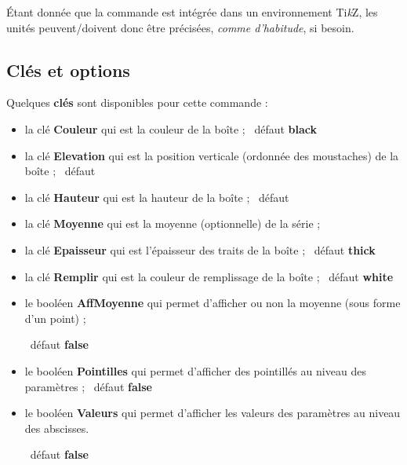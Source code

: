 \documentclass[a4paper,french,11pt]{article}
\providecommand\tikzlogo{Ti\textit{k}Z}
\let\TikZ\tikzlogo
\newcommand\Cle[1]{{\bfseries\sffamily\textlangle #1\textrangle}}
\begin{document}
\begin{PresCodePL}{}
\end{PresCodePL}

\begin{noteblock}
Étant donnée que la commande est intégrée dans un environnement \TikZ, les unités peuvent/doivent donc être précisées, \textit{comme d'habitude}, si besoin.
\end{noteblock}

\subsection{Clés et options}

\begin{cautionblock}
Quelques \Cle{clés} sont disponibles pour cette commande :

\begin{itemize}
	\item la clé \Cle{Couleur} qui est la couleur de la boîte ; \hfill~défaut \Cle{black}
	\item la clé \Cle{Elevation} qui est la position verticale (ordonnée des moustaches) de la boîte ; \hfill~défaut \Cle{1.5}
	\item la clé \Cle{Hauteur} qui est la hauteur de la boîte ; \hfill~défaut \Cle{1}
	\item la clé \Cle{Moyenne} qui est la moyenne (optionnelle) de la série ;
	\item la clé \Cle{Epaisseur} qui est l'épaisseur des traits de la boîte ; \hfill~défaut \Cle{thick}
	\item la clé \Cle{Remplir} qui est la couleur de remplissage de la boîte ; \hfill~défaut \Cle{white}
	\item le booléen \Cle{AffMoyenne} qui permet d'afficher ou non la moyenne (sous forme d'un point) ;
	
	\hfill~défaut \Cle{false}
	\item le booléen \Cle{Pointilles} qui permet d'afficher des pointillés au niveau des paramètres ; \hfill~défaut \Cle{false}
	\item le booléen \Cle{Valeurs} qui permet d'afficher les valeurs des paramètres au niveau des abscisses.
	
	\hfill~défaut \Cle{false}
\end{itemize}
\vspace*{-\baselineskip}\leavevmode
\end{cautionblock}
\end{document}
